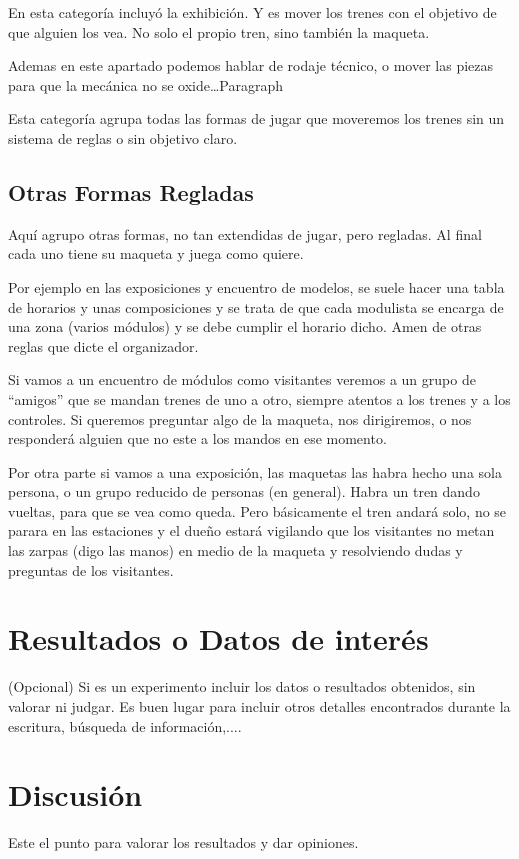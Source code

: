 En esta categoría incluyó la exhibición. Y es mover los trenes con el objetivo de que alguien los vea. No solo el propio tren, sino también la maqueta.

Ademas en este apartado podemos hablar de rodaje técnico, o mover las piezas para que la mecánica no se oxide…Paragraph

Esta categoría agrupa todas las formas de jugar que moveremos los trenes sin un sistema de reglas o sin objetivo claro.

\subsection{Otras Formas Regladas}
Aquí agrupo otras formas, no tan extendidas de jugar, pero regladas. Al final cada uno tiene su maqueta y juega como quiere.

Por ejemplo en las exposiciones y encuentro de modelos, se suele hacer una tabla de horarios y unas composiciones y se trata de que cada modulista se encarga de una zona (varios módulos) y se debe cumplir el horario dicho. Amen de otras reglas que dicte el organizador.

Si vamos a un encuentro de módulos como visitantes veremos a un grupo de “amigos” que se mandan trenes de uno a otro, siempre atentos a los trenes y a los controles. Si queremos preguntar algo de la maqueta, nos dirigiremos, o nos responderá alguien que no este a los mandos en ese momento.

Por otra parte si vamos a una exposición, las maquetas las habra hecho una sola persona, o un grupo reducido de personas (en general). Habra un tren dando vueltas, para que se vea como queda. Pero básicamente el tren andará solo, no se parara en las estaciones y el dueño estará vigilando que los visitantes no metan las zarpas (digo las manos) en medio de la maqueta y resolviendo dudas y preguntas de los visitantes.

\section{Resultados o Datos de interés}(Opcional) 
Si es un experimento incluir los datos o resultados obtenidos, sin valorar ni judgar. Es buen lugar para incluir otros detalles encontrados durante la escritura, búsqueda de información,....
\section{Discusión}
Este el punto para valorar los resultados y dar opiniones.
